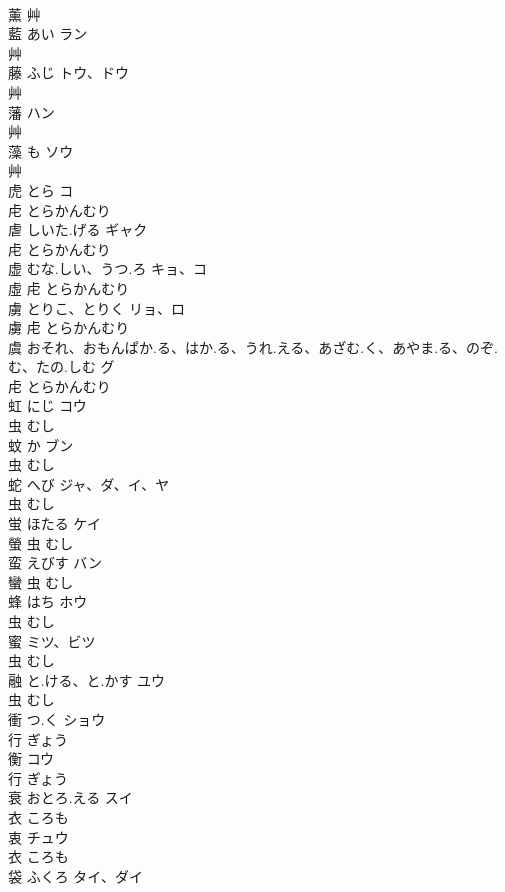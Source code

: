\documentclass[8pt]{extreport}
\begin{document}
\begin{CJK}{UTF8}{min}
\\	薰	艸				
\\	藍	あい	ラン	
\\	艸				
\\	藤	ふじ	トウ、ドウ	
\\	艸				
\\	藩		ハン	
\\	艸				
\\	藻	も	ソウ	
\\	艸				
\\	虎	とら	コ	
\\	虍		とらかんむり		
\\	虐	しいた.げる	ギャク	
\\	虍		とらかんむり		
\\	虚	むな.しい、うつ.ろ	キョ、コ	
\\	虛	虍		とらかんむり		
\\	虜	とりこ、とりく	リョ、ロ	
\\	虜	虍		とらかんむり		
\\	虞	おそれ、おもんぱか.る、はか.る、うれ.える、あざむ.く、あやま.る、のぞ.む、たの.しむ	グ	
\\	虍		とらかんむり		
\\	虹	にじ	コウ	
\\	虫		むし		
\\	蚊	か	ブン	
\\	虫		むし		
\\	蛇	へび	ジャ、ダ、イ、ヤ	
\\	虫		むし		
\\	蛍	ほたる	ケイ	
\\	螢	虫		むし		
\\	蛮	えびす	バン	
\\	蠻	虫		むし		
\\	蜂	はち	ホウ	
\\	虫		むし		
\\	蜜		ミツ、ビツ	
\\	虫		むし		
\\	融	と.ける、と.かす	ユウ	
\\	虫		むし		
\\	衝	つ.く	ショウ	
\\	行		ぎょう		
\\	衡		コウ	
\\	行		ぎょう		
\\	衰	おとろ.える	スイ	
\\	衣		ころも		
\\	衷		チュウ	
\\	衣		ころも		
\\	袋	ふくろ	タイ、ダイ	

\end{CJK}
\end{document}
